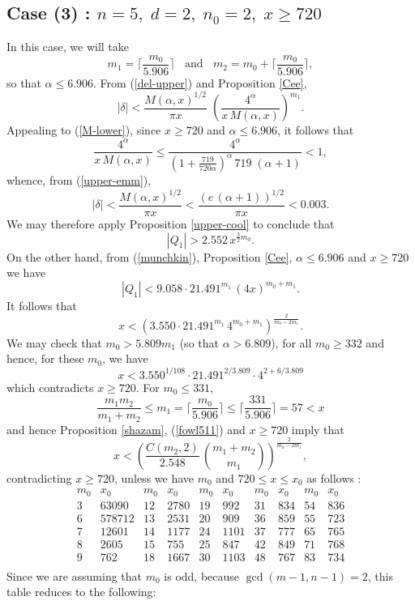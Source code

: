  
\subsection{Case (3) : $n=5, \; d=2, \;  n_0=2, \; x \geq 720$}

In this case, we will take
$$
m_1 = \Big\lceil \frac{m_0}{5.906} \Big\rceil \; \; \mbox{ and } \; \; m_2 = m_0+  \Big\lceil \frac{m_0}{5.906} \Big\rceil,
$$
so that $\alpha \leq 6.906$. 
From (\ref{del-upper}) and   Proposition \ref{Cee}, 
$$
|\delta| < \frac{M(\alpha,x)^{1/2}}{\pi x} \; \left( \frac{4^{\alpha} }{x \, M(\alpha,x)} \right)^{m_1}.
$$
Appealing to (\ref{M-lower}), since $x \geq 720$ and $\alpha \leq 6.906$, it follows that 
$$
\frac{4^{\alpha} }{x \, M(\alpha,x)} \leq \frac{4^{\alpha} }{\left( 1 + \frac{719}{720 \alpha} \right)^\alpha \, 719 \; (\alpha+1)} < 1,
$$
whence, from (\ref{upper-emm}), 
$$
|\delta| < \frac{M(\alpha,x)^{1/2}}{\pi x} < \frac{(e \, (\alpha+1))^{1/2}}{\pi x}  < 0.003.
$$
We may therefore apply Proposition \ref{upper-cool} to conclude that
\begin{equation}\label{fowl511}
 |Q_1| > 2.552 \, x^{\frac{3}{2}m_0}.
\end{equation}
On the other hand, from (\ref{munchkin}), Proposition \ref{Cee}, $\alpha \leq 6.906$ and $x \geq 720$ we have
$$
|Q_1| < 9.058 \cdot 21.491^{m_1}  \, (4x)^{m_0+m_1}.
$$
 It follows that
\[
x < \left( 3.550 \cdot 21.491^{m_1}  \, 4^{m_0+m_1} \right)^{\frac{2}{m_0-2m_1}}.
\]
 We may check that $m_0>5.809 m_1$ (so that $\alpha>6.809$), for all $m_0 \geq 332$ and hence, for these $m_0$, we have 
 $$
 x < 3.550^{1/108} \cdot 21.491^{2/3.809} \cdot 4^{2+6/3.809}
 $$
 which contradicts  $x \geq 720$. For $m_0\leq 331$, 
$$
\frac{m_1m_2}{m_1+m_2} \leq m_1 = \Big\lceil \frac{m_0}{5.906} \Big\rceil \leq   \Big\lceil \frac{331}{5.906} \Big\rceil= 57 < x
$$
 and hence Proposition \ref{shazam}, (\ref{fowl511}) and $x \geq 720$ imply that
$$
x < \left( \frac{C(m_2, 2)}{2.548} \, \binom{m_1+m_2}{m_1} \right)^{\frac{2}{m_0-2m_1}},
$$
contradicting $x \geq 720$, unless  we have $m_0$ and $720 \leq x \leq x_0$ as follows :
$$
\begin{array}{cc|cc|cc|cc|cc} 
m_0 & x_0 & m_0 & x_0 & m_0 & x_0 & m_0 & x_0 & m_0 & x_0\\ \hline
3 & 63090 & 12 & 2780 & 19 & 992 & 31 & 834 & 54 & 836 \\
6 & 578712 & 13 & 2531 & 20 & 909 & 36 & 859 & 55 & 723 \\
7 & 12601 & 14 & 1177 & 24 & 1101 & 37 & 777 & 65 & 765\\
8 & 2605 & 15 & 755 & 25 & 847 & 42 & 849 & 71 & 768\\
9 & 762 & 18 & 1667 & 30 & 1103 & 48 & 767 & 83 & 734\\
\end{array}
$$
Since we are assuming that $m_0$ is odd, because $\gcd(m-1, n-1)=2$,  this table reduces to the following:

